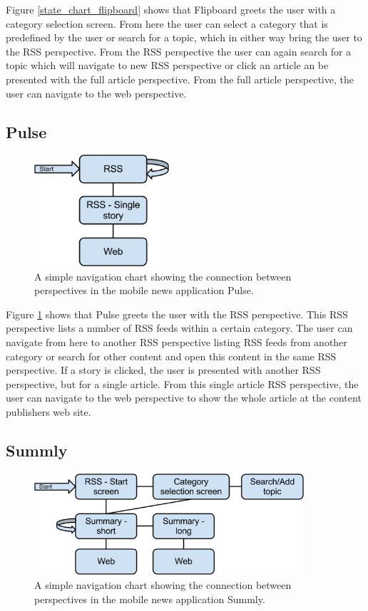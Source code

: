Figure \ref{state_chart_flipboard} shows that Flipboard greets the user with a category selection screen. From here the user can select a category that is predefined by the user or search for a topic, which in either way bring the user to the RSS perspective. From the RSS perspective the user can again search for a topic which will navigate to new RSS perspective or click an article an be presented with the full article perspective. From the full article perspective, the user can navigate to the web perspective.

\subsection{Pulse}

\begin{figure}[!htbp]
\centering
\includegraphics[width=50mm]{GFX/statecharts/Pulse.png}
\caption{A simple navigation chart showing the connection between perspectives in the mobile news application Pulse.}
\label{state_chart_pulse}
\end{figure}

Figure \ref{state_chart_pulse} shows that Pulse greets the user with the RSS perspective. This RSS perspective lists a number of RSS feeds within a certain category. The user can navigate from here to another RSS perspective listing RSS feeds from another category or search for other content and open this content in the same RSS perspective. If a story is clicked, the user is presented with another RSS perspective, but for a single article. From this single article RSS perspective, the user can navigate to the web perspective to show the whole article at the content publishers web site. 

\subsection{Summly}

\begin{figure}[!htbp]
\centering
\includegraphics[width=100mm]{GFX/statecharts/Summly.png}
\caption{A simple navigation chart showing the connection between perspectives in the mobile news application Summly.}
\label{state_chart_summly}
\end{figure}

